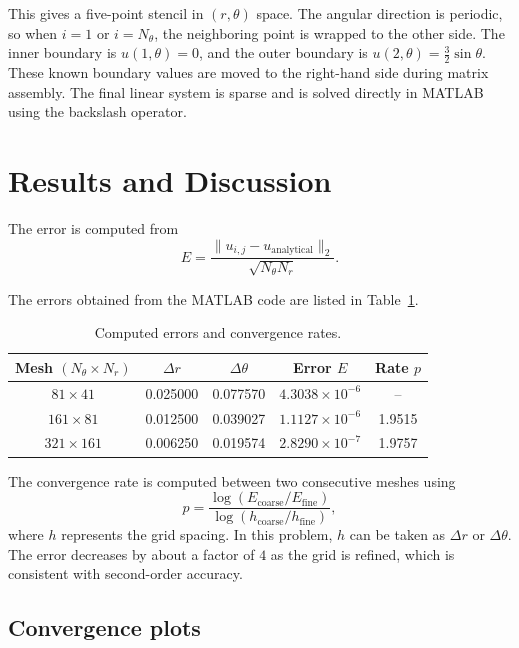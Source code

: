 \documentclass[12pt,a4paper]{article}
\begin{document}
This gives a five-point stencil in $(r,\theta)$ space. The angular direction is periodic, so when $i=1$ or $i=N_\theta$, the neighboring point is wrapped to the other side. The inner boundary is $u(1,\theta)=0$, and the outer boundary is $u(2,\theta)=\frac{3}{2}\sin\theta$. These known boundary values are moved to the right-hand side during matrix assembly. The final linear system is sparse and is solved directly in MATLAB using the backslash operator.

\section*{Results and Discussion}

The error is computed from
\begin{equation}
E=\frac{\|u_{i,j}-u_{\text{analytical}}\|_2}{\sqrt{N_\theta N_r}}.
\label{eq:error}
\end{equation}

The errors obtained from the MATLAB code are listed in Table~\ref{tab:errors}.

\begin{table}[H]
\centering
\caption{Computed errors and convergence rates.}
\label{tab:errors}
\begin{tabular}{@{}ccccc@{}}
\toprule
Mesh $(N_\theta\times N_r)$ & $\Delta r$ & $\Delta\theta$ & Error $E$ & Rate $p$ \\
\midrule
$81\times41$   & 0.025000 & 0.077570 & $4.3038\times10^{-6}$ & -- \\
$161\times81$  & 0.012500 & 0.039027 & $1.1127\times10^{-6}$ & 1.9515 \\
$321\times161$ & 0.006250 & 0.019574 & $2.8290\times10^{-7}$ & 1.9757 \\
\bottomrule
\end{tabular}
\end{table}

The convergence rate is computed between two consecutive meshes using
\begin{equation}
p = \frac{\log\left(E_{\text{coarse}}/E_{\text{fine}}\right)}{\log\left(h_{\text{coarse}}/h_{\text{fine}}\right)},
\label{eq:rate}
\end{equation}
where $h$ represents the grid spacing. In this problem, $h$ can be taken as $\Delta r$ or $\Delta\theta$. The error decreases by about a factor of $4$ as the grid is refined, which is consistent with second-order accuracy.

\subsection*{Convergence plots}
\end{document}
